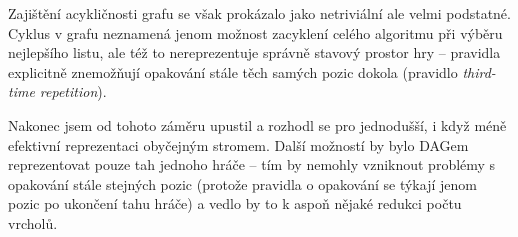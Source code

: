 \documentclass{article}
\begin{document}
Zajištění acykličnosti grafu se však prokázalo jako netriviální ale velmi
podstatné. Cyklus v grafu neznamená jenom možnost zacyklení celého algoritmu při 
výběru nejlepšího listu, ale též to nereprezentuje správně stavový prostor hry 
-- pravidla explicitně znemožňují opakování stále těch samých pozic dokola 
(pravidlo \emph{third-time repetition}).

Nakonec jsem od tohoto záměru upustil a rozhodl se pro jednodušší, i když méně
efektivní reprezentaci obyčejným stromem. Další možností by bylo DAGem
reprezentovat pouze tah jednoho hráče -- tím by nemohly vzniknout problémy s
opakování stále stejných pozic (protože pravidla o opakování se týkají jenom
pozic po ukončení tahu hráče) a vedlo by to k aspoň nějaké redukci počtu 
vrcholů.
\end{document}
